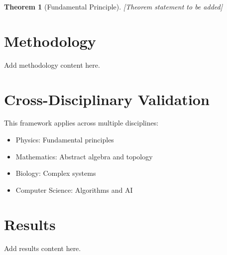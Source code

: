 \documentclass[12pt]{article}
\newtheorem{theorem}{Theorem}
\begin{document}
\begin{theorem}[Fundamental Principle]
[Theorem statement to be added]
\end{theorem}

\section{Methodology}
\label{sec:methodology}

Add methodology content here.



\section{Cross-Disciplinary Validation}

This framework applies across multiple disciplines:
\begin{itemize}
    \item Physics: Fundamental principles
    \item Mathematics: Abstract algebra and topology
    \item Biology: Complex systems
    \item Computer Science: Algorithms and AI
\end{itemize}

\section{Results}
\label{sec:results}

Add results content here.
\end{document}
